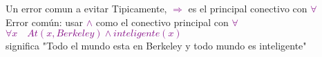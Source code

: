     \begin{frame}{Un error comun a evitar}
        Tipicamente, \textcolor{Purple}{$\Rightarrow$} es el principal conectivo con \textcolor{Purple}{$\forall$}\\
        Error común: usar \textcolor{Purple}{$\wedge$} como el conectivo principal con \textcolor{Purple}{$\forall$}\\
        \quad\textcolor{Purple}{$\forall x \quad At(x,Berkeley)\wedge inteligente(x)$}\\
        significa "Todo el mundo esta en Berkeley y todo mundo es inteligente"
    \end{frame}
